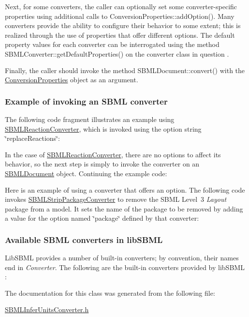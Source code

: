 Next, for some converters, the caller can optionally set some converter-\/specific properties using additional calls to Conversion\+Properties\+::add\+Option(). Many converters provide the ability to configure their behavior to some extent; this is realized through the use of properties that offer different options. The default property values for each converter can be interrogated using the method S\+B\+M\+L\+Converter\+::get\+Default\+Properties() on the converter class in question .

Finally, the caller should invoke the method S\+B\+M\+L\+Document\+::convert() with the \hyperlink{class_conversion_properties}{Conversion\+Properties} object as an argument.\hypertarget{classdoc__section__using__sbml__converters_converter-example}{}\subsubsection{Example of invoking an S\+B\+M\+L converter}\label{classdoc__section__using__sbml__converters_converter-example}
The following code fragment illustrates an example using \hyperlink{class_s_b_m_l_reaction_converter}{S\+B\+M\+L\+Reaction\+Converter}, which is invoked using the option string {\ttfamily \char`\"{}replace\+Reactions\char`\"{}}\+:

In the case of \hyperlink{class_s_b_m_l_reaction_converter}{S\+B\+M\+L\+Reaction\+Converter}, there are no options to affect its behavior, so the next step is simply to invoke the converter on an \hyperlink{class_s_b_m_l_document}{S\+B\+M\+L\+Document} object. Continuing the example code\+:

Here is an example of using a converter that offers an option. The following code invokes \hyperlink{class_s_b_m_l_strip_package_converter}{S\+B\+M\+L\+Strip\+Package\+Converter} to remove the S\+B\+ML Level~3 {\itshape Layout} package from a model. It sets the name of the package to be removed by adding a value for the option named {\ttfamily \char`\"{}package\char`\"{}} defined by that converter\+:\hypertarget{classdoc__section__using__sbml__converters_available-converters}{}\subsubsection{Available S\+B\+M\+L converters in lib\+S\+B\+ML}\label{classdoc__section__using__sbml__converters_available-converters}
Lib\+S\+B\+ML provides a number of built-\/in converters; by convention, their names end in {\itshape Converter}. The following are the built-\/in converters provided by lib\+S\+B\+ML \+:

The documentation for this class was generated from the following file\+:\begin{DoxyCompactItemize}
\item 
\hyperlink{_s_b_m_l_infer_units_converter_8h}{S\+B\+M\+L\+Infer\+Units\+Converter.\+h}\end{DoxyCompactItemize}
